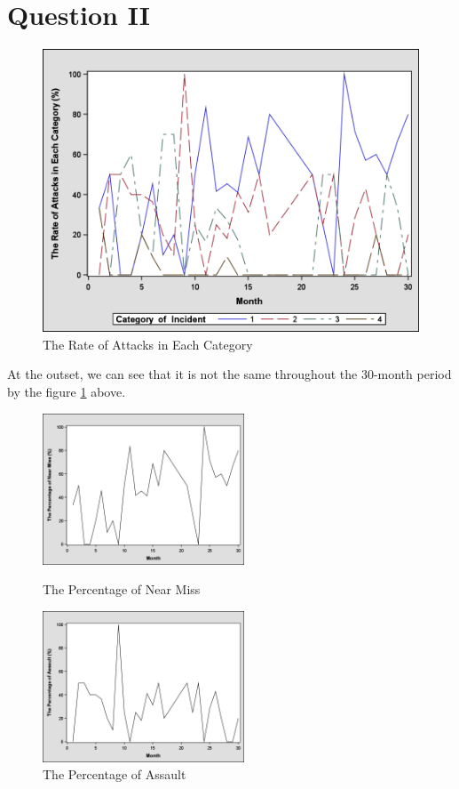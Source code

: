 \section*{Question II}

\begin{figure}[H]
\centering
\includegraphics[scale=0.25]{Pic/Q2/1.png}
\caption{The Rate of Attacks in Each Category}
\label{f5}
\end{figure}

At the outset, we can see that it is not the same throughout the 30-month period by the figure \ref{f5} above.

\begin{figure}[htbp]
\centering
\begin{minipage}[t]{0.48\textwidth}
\centering
\includegraphics[width=6cm]{Pic/Q2/2.png}
\caption{The Percentage of Near Miss}
\label{f6}
\end{minipage}
\begin{minipage}[t]{0.48\textwidth}
\centering
\includegraphics[width=6cm]{Pic/Q2/3.png}
\caption{The Percentage of Assault}
\label{f7}
\end{minipage}
\end{figure}

